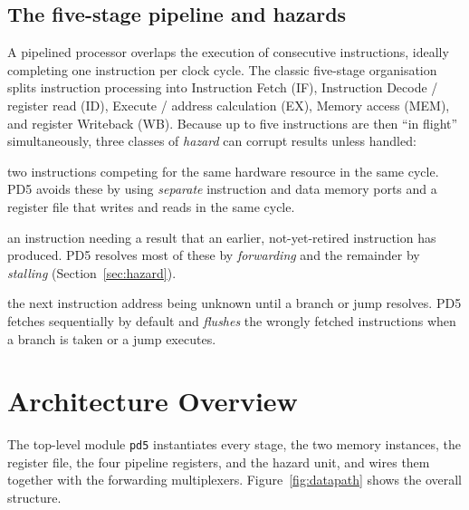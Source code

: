 \documentclass[11pt,a4paper]{article}
\newcommand{\code}[1]{\texttt{#1}}          %
\begin{document}
\subsection{The five-stage pipeline and hazards}
A pipelined processor overlaps the execution of consecutive instructions, ideally
completing one instruction per clock cycle. The classic five-stage organisation splits
instruction processing into Instruction Fetch (IF), Instruction Decode / register read
(ID), Execute / address calculation (EX), Memory access (MEM), and register Writeback
(WB). Because up to five instructions are then ``in flight'' simultaneously, three classes
of \emph{hazard} can corrupt results unless handled:

\begin{description}[leftmargin=1.6cm,style=nextline]
  \item[Structural hazards] two instructions competing for the same hardware resource in
    the same cycle. PD5 avoids these by using \emph{separate} instruction and data memory
    ports and a register file that writes and reads in the same cycle.
  \item[Data hazards] an instruction needing a result that an earlier, not-yet-retired
    instruction has produced. PD5 resolves most of these by \emph{forwarding} and the
    remainder by \emph{stalling} (Section~\ref{sec:hazard}).
  \item[Control hazards] the next instruction address being unknown until a branch or jump
    resolves. PD5 fetches sequentially by default and \emph{flushes} the wrongly fetched
    instructions when a branch is taken or a jump executes.
\end{description}

\section{Architecture Overview}
\label{sec:arch}
The top-level module \code{pd5} instantiates every stage, the two memory instances, the
register file, the four pipeline registers, and the hazard unit, and wires them together
with the forwarding multiplexers. Figure~\ref{fig:datapath} shows the overall structure.
\end{document}
